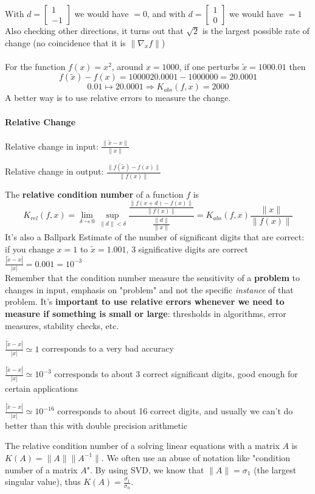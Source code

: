 \documentclass[10pt]{report}
\begin{document}
With $d = \left[\begin{array}{c}
1\\-1
\end{array}\right]$ we would have $= 0$, and with $d = \left[\begin{array}{c}
1\\0
\end{array}\right]$ we would have $= 1$\\
Also checking other directions, it turns out that $\sqrt{2}$ is the largest possible rate of change (no coincidence that it is $\|\nabla_x f\|$)\\\\
For the function $f(x) = x^2$, around $x=1000$, if one perturbs $\tilde{x}=1000.01$ then $$f(\tilde{x})-f(x) = 1000020.0001-1000000 = 20.0001$$ $$0.01\mapsto 20.0001 \Rightarrow K_{abs}(f,x) = 2000$$
A better way is to use relative errors to measure the change.
\paragraph{Relative Change}\begin{list}{}{}
	\item Relative change in input: $\frac{\|\tilde{x}-x\|}{\|x\|}$
	\item Relative change in output: $\frac{\|f(\tilde{x})-f(x)\|}{\|f(x)\|}$
\end{list}
The \textbf{relative condition number} of a function $f$ is 
$$K_{rel}(f,x)=\lim_{\delta\to0}\sup_{\|d\|<\delta} \frac{\frac{\|f(x+d)-f(x)\|}{\|f(x)\|}}{\frac{\|d\|}{\|x\|}} = K_{abs}(f,x)\frac{\|x\|}{\|f(x)\|}$$
It's also a Ballpark Estimate of the number of significant digits that are correct: if you change $x=1$ to $\tilde{x}=1.001$, $3$ significative digits are correct $\frac{|\tilde{x}-x|}{|x|}=0.001 = 10^{-3}$\\
Remember that the condition number measure the sensitivity of a \textbf{problem} to changes in input, emphasis on "problem" and not the specific \textit{instance} of that problem. It's \textbf{important to use relative errors whenever we need to measure if something is small or large}: thresholds in algorithms, error measures, stability checks, etc.
\begin{list}{}{}
	\item $\frac{|\tilde{x}-x|}{|x|}\simeq 1$ corresponds to a very bad accuracy
	\item $\frac{|\tilde{x}-x|}{|x|}\simeq 10^{-3}$ corresponds to about 3 correct significant digits, good enough for certain applications
	\item $\frac{|\tilde{x}-x|}{|x|}\simeq 10^{-16}$ corresponds to about 16 correct digits, and usually we can't do better than this with double precision arithmetic
\end{list}
The relative condition number of a solving linear equations with a matrix $A$ is $K(A)=\|A\|\|A^{-1}\|$. We often use an abuse of notation like "condition number of a matrix $A$". By using SVD, we know that $\|A\|=\sigma_1$ (the largest singular value), thus $K(A)=\frac{\sigma_1}{\sigma_n}$.
\end{document}

